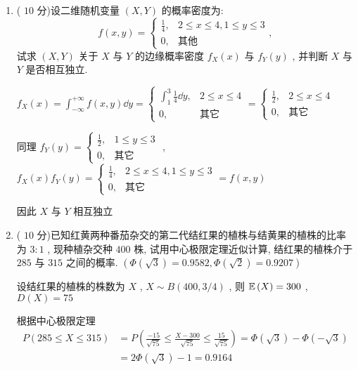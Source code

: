 \begin{enumerate}
	\item ( $10$ 分)设二维随机变量 $(X,Y)$ 的概率密度为:
	\begin{equation*}
	f(x,y)=
	\begin{cases}
	\frac{1}{4}, & 2\leq x\leq4,1\leq y\leq3\\
	0, & \text{其他}
	\end{cases},
	\end{equation*}
	试求 $(X,Y)$ 关于 $X$ 与 $Y$ 的边缘概率密度 $f_X(x)$ 与 $f_Y(y)$ , 并判断 $X$ 与 $Y$ 是否相互独立.
	\begin{solution}
		$f_X(x)=\int_{-\infty}^{+\infty}f(x,y)\dd y=
		\begin{cases}
		\int_{1}^{3}\frac{1}{4}\dd y, & 2\leq x\leq4\\
		0, & \text{其它}
		\end{cases}=\begin{cases}
		\frac{1}{2}, & 2\leq x\leq4\\
		0, & \text{其它}
		\end{cases}
		$
		
		同理 $f_Y(y)=
		\begin{cases}
		\frac{1}{2}, & 1\leq y\leq3\\
		0, & \text{其它}
		\end{cases}
		$ , $f_X(x)f_Y(y)=
		\begin{cases}
		\frac{1}{4}, & 2\leq x\leq4,1\leq y\leq 3\\
		0, & \text{其它}
		\end{cases}=f(x,y)
		$
		
		因此 $X$ 与 $Y$ 相互独立
	\end{solution}
	
	\item ( $10$ 分)已知红黄两种番茄杂交的第二代结红果的植株与结黄果的植株的比率为 $3:1$ , 现种植杂交种 $400$ 株, 试用中心极限定理近似计算, 结红果的植株介于 $285$ 与 $315$ 之间的概率. $\left(\varPhi\left(\sqrt{3}\right)=0.9582,\varPhi\left(\sqrt{2}\right)=0.9207\right)$
	\begin{solution}
		设结红果的植株的株数为 $X$ , $X\sim B(400,3/4)$ , 则 $\mathbb{E}\,(X)=300$ , $D(X)=75$
		
		根据中心极限定理
			\begin{align*}
			 P(285\leq X\leq 315)&=P\left(\frac{-15}{\sqrt{75}}\leq\frac{X-300}{\sqrt{75}}\leq\frac{15}{\sqrt{75}}\right)=\varPhi\left(\sqrt{3}\right)-\varPhi\left(-\sqrt{3}\right)\\
			&=2\varPhi\left(\sqrt{3}\right)-1=0.9164
			\end{align*}
	\end{solution}
	

\end{enumerate}
